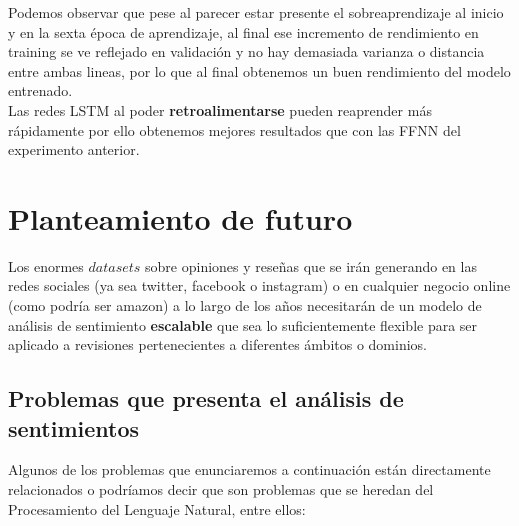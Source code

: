 \documentclass[a4paper,12pt]{report}
\begin{document}
\vspace{4mm}
Podemos observar que pese al parecer estar presente el sobreaprendizaje al inicio y en la sexta época de aprendizaje, al final ese incremento de rendimiento en training se ve reflejado en validación y no hay demasiada varianza o distancia entre ambas lineas, por lo que al final obtenemos un buen rendimiento del modelo entrenado.
\vspace{2mm}\\
Las redes LSTM al poder \textbf{retroalimentarse} pueden reaprender más rápidamente por ello obtenemos mejores resultados que con las FFNN del experimento anterior.


\chapter{Planteamiento de futuro}

Los enormes $datasets$ sobre opiniones y reseñas que se irán generando en las redes sociales (ya sea twitter, facebook o instagram) o en cualquier negocio online (como podría ser amazon) a lo largo de los años necesitarán de un
modelo de análisis de sentimiento \textbf{escalable} que sea lo suficientemente flexible
para ser aplicado a revisiones pertenecientes a diferentes ámbitos o dominios.

\section{Problemas que presenta el análisis de sentimientos}

{\setlength{\parindent}{0cm}
Algunos de los problemas que enunciaremos a continuación están directamente relacionados o podríamos decir que son problemas que se heredan del Procesamiento del Lenguaje Natural, entre ellos:}
\end{document}
